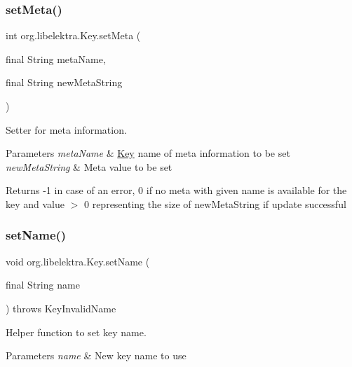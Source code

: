 \subsubsection{\texorpdfstring{setMeta()}{setMeta()}}
{\footnotesize\ttfamily int org.\+libelektra.\+Key.\+set\+Meta (\begin{DoxyParamCaption}\item[{final String}]{meta\+Name,  }\item[{final String}]{new\+Meta\+String }\end{DoxyParamCaption})\hspace{0.3cm}{\ttfamily [inline]}}



Setter for meta information. 


\begin{DoxyParams}{Parameters}
{\em meta\+Name} & \mbox{\hyperlink{classorg_1_1libelektra_1_1Key}{Key}} name of meta information to be set \\
\hline
{\em new\+Meta\+String} & Meta value to be set \\
\hline
\end{DoxyParams}
\begin{DoxyReturn}{Returns}
-\/1 in case of an error, 0 if no meta with given name is available for the key and value $>$ 0 representing the size of new\+Meta\+String if update successful 
\end{DoxyReturn}
\mbox{\label{classorg_1_1libelektra_1_1Key_abd5602765701a10b6a10887c09810cf5}} 
\subsubsection{\texorpdfstring{setName()}{setName()}}
{\footnotesize\ttfamily void org.\+libelektra.\+Key.\+set\+Name (\begin{DoxyParamCaption}\item[{final String}]{name }\end{DoxyParamCaption}) throws Key\+Invalid\+Name\hspace{0.3cm}{\ttfamily [inline]}}



Helper function to set key name. 


\begin{DoxyParams}{Parameters}
{\em name} & New key name to use \\
\hline
\end{DoxyParams}

